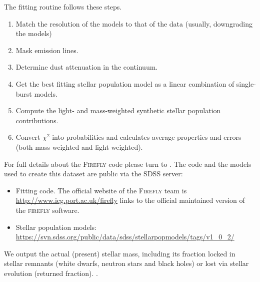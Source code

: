 \documentclass[onecolumn]{aa}
\begin{document}
The fitting routine follows these steps.
\begin{enumerate}
\item Match the resolution of the models to that of the data (usually, downgrading the models)
\item Mask emission lines.
\item Determine dust attenuation in the continuum.
\item Get the best fitting stellar population model as a linear combination of single-burst models.
\item Compute the light- and mass-weighted synthetic stellar population contributions.
\item Convert $\chi^2$ into probabilities and calculates average properties and errors (both mass weighted and light weighted).%
\end{enumerate}
For full details about the \textsc{Firefly} code please turn to \citet{firefly2017MNRAS}. 
The code and the models used to create this dataset are public via the SDSS server:
\begin{itemize}
\item Fitting code. The official website of the \textsc{Firefly} team is \url{http://www.icg.port.ac.uk/firefly} links to the official maintained version of the \textsc{firefly} software. 
\item Stellar population models: \url{https://svn.sdss.org/public/data/sdss/stellarpopmodels/tags/v1_0_2/} 
\end{itemize}
We output the actual (present) stellar mass, including its fraction locked in stellar remnants (white dwarfs, neutron stars and black holes) or lost via stellar evolution (returned fraction). 
.
\end{document}
